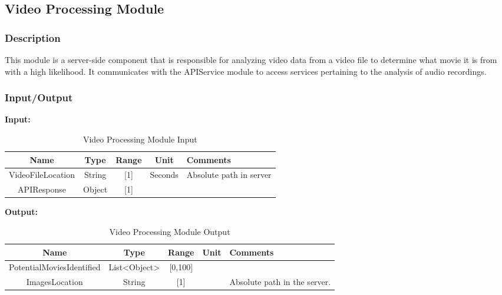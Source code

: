\documentclass{article}
\begin{document}
\subsection{Video Processing Module}

\subsubsection{Description}

This module is a server-side component that is responsible for analyzing video data from a video file to determine what movie it is from with a high likelihood. It communicates with the APIService module to access services pertaining to the analysis of audio recordings.

\subsubsection{Input/Output}
\textbf{Input:}
\begin{table}[H]
    \caption{Video Processing Module Input}
    \centering
    \begin{tabularx}{0.7\textwidth}{|c|c|c|c|X|} \hline
        \textbf{Name} & \textbf{Type} & \textbf{Range} & \textbf{Unit} & \textbf{Comments} \\ \hline
        VideoFileLocation & String & [1] & Seconds & Absolute path in server \\ \hline
        APIResponse & Object & [1] & & \\ \hline
    \end{tabularx}
    \label{tab:Video_Processing_Input}
\end{table}

\textbf{Output:}
\begin{table}[H]
    \caption{Video Processing Module Output}
    \centering
    \begin{tabularx}{0.7\textwidth}{|c|c|c|c|X|} \hline
        \textbf{Name} & \textbf{Type} & \textbf{Range} & \textbf{Unit} & \textbf{Comments} \\ \hline
        PotentialMoviesIdentified & List<Object> & [0,100] & &\\ \hline
        ImagesLocation & String & [1] & & Absolute path in the server. \\ \hline
    \end{tabularx}
    \label{tab:Video_Processing_Output}
\end{table}
\end{document}
